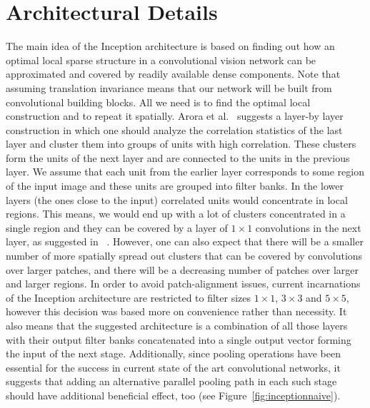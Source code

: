 \section{Architectural Details}

The main idea of the Inception architecture is based on finding out how an optimal local sparse structure in a convolutional vision network can be approximated and covered by readily available dense components. Note that assuming translation invariance means that our network will be built from convolutional building blocks. All we need is to find the optimal local construction and to repeat it spatially. Arora et al.~\cite{arora2013bounds} suggests a layer-by layer construction in which one should analyze the correlation statistics of the last layer and cluster them into groups of units with high correlation. These clusters form the units of the next layer and are connected to the units in the previous layer. We assume that each unit from the earlier layer corresponds to some region of the input image and these units are grouped into filter banks. In the lower layers (the ones close to the input) correlated units would concentrate in local regions. This means, we would end up with a lot of clusters concentrated in a single region and they can be covered by a layer of $1{\times}1$ convolutions in the next layer, as suggested in ~\cite{lin2013nin}. However, one can also expect that there will be a smaller number of more spatially spread out clusters that can be covered by convolutions over larger patches, and there will be a decreasing number of patches over larger and larger regions. In order to avoid patch-alignment issues, current incarnations of the Inception architecture are restricted to filter sizes $1{\times}1$, $3{\times}3$ and $5{\times}5$, however this decision was based more on convenience rather than necessity. It also means that the suggested architecture is a combination of all those layers with their output filter banks concatenated into a single output vector forming the input of the next stage. Additionally, since pooling operations have been essential for the success in current state of the art convolutional networks, it suggests that adding an alternative parallel pooling path in each such stage should have additional beneficial effect, too (see Figure~\ref{fig:inceptionnaive}).

